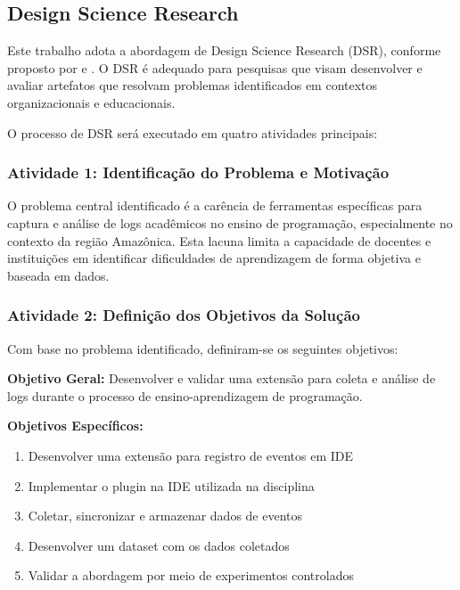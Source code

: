 \subsection{Design Science Research}
\label{subsec:dsr}

Este trabalho adota a abordagem de Design Science Research (DSR), conforme proposto por \cite{peffers2007design} e \cite{hevner2004design}. O DSR é adequado para pesquisas que visam desenvolver e avaliar artefatos que resolvam problemas identificados em contextos organizacionais e educacionais.

O processo de DSR será executado em quatro atividades principais:

\subsubsection{Atividade 1: Identificação do Problema e Motivação}
\label{subsubsec:problema-motivacao}

O problema central identificado é a carência de ferramentas específicas para captura e análise de logs acadêmicos no ensino de programação, especialmente no contexto da região Amazônica. Esta lacuna limita a capacidade de docentes e instituições em identificar dificuldades de aprendizagem de forma objetiva e baseada em dados.

\subsubsection{Atividade 2: Definição dos Objetivos da Solução}
\label{subsubsec:objetivos-solucao}

Com base no problema identificado, definiram-se os seguintes objetivos:

\textbf{Objetivo Geral:}
Desenvolver e validar uma extensão para coleta e análise de logs durante o processo de ensino-aprendizagem de programação.

\textbf{Objetivos Específicos:}
\begin{enumerate}
    \item Desenvolver uma extensão para registro de eventos em IDE
    \item Implementar o plugin na IDE utilizada na disciplina
    \item Coletar, sincronizar e armazenar dados de eventos
    \item Desenvolver um dataset com os dados coletados
    \item Validar a abordagem por meio de experimentos controlados
\end{enumerate}

